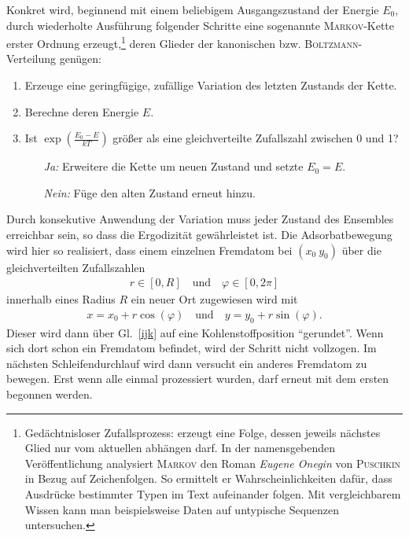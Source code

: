 \documentclass[a4paper, 10pt, twoside, openany]{book} %
\newcommand \parens[1]{\left ( #1 \right )}
\def \phi {\varphi}
\begin{document}
Konkret wird, beginnend mit einem beliebigem Ausgangszustand der Energie $E_0$, durch wiederholte Ausführung folgender Schritte eine sogenannte \textsc{Markov}-Kette erster Ordnung erzeugt,\footnote{Gedächtnisloser Zufallsprozess: erzeugt eine Folge, dessen jeweils nächstes Glied nur vom aktuellen abhängen darf. In der namensgebenden Veröffentlichung \cite{Markov} analysiert \textsc{Markov} den Roman \emph{Eugene Onegin} von \textsc{Puschkin} in Bezug auf Zeichenfolgen. So  ermittelt er Wahrscheinlichkeiten dafür, dass Ausdrücke bestimmter Typen im Text aufeinander folgen. Mit vergleichbarem Wissen kann man beispielsweise Daten auf untypische Sequenzen untersuchen.} deren Glieder der kanonischen bzw. \textsc{Boltzmann}-Verteilung genügen:
%
\begin{enumerate}
    \item Erzeuge eine geringfügige, zufällige Variation des letzten Zustands der Kette.
    \item Berechne deren Energie $E$.
    \item Ist $\exp \parens{\frac{E_0 - E}{k T}}$ größer als eine gleichverteilte Zufallszahl zwischen 0 und 1?
    \begin{itemize}
        \item[\emph{Ja:}] Erweitere die Kette um neuen Zustand und setzte $E_0 = E$.
        \item[\emph{Nein:}] Füge den alten Zustand erneut hinzu.
    \end{itemize}
\end{enumerate}
%
Durch konsekutive Anwendung der Variation muss jeder Zustand des Ensembles erreichbar sein, so dass die Ergodizität gewährleistet ist. Die Adsorbatbewegung wird hier so realisiert, dass einem einzelnen Fremdatom bei $(x_0 \ y_0)$ über die gleichverteilten Zufallszahlen
%
\begin{align*}
    r \in [0, R] \quad \text{und} \quad \phi \in [0, 2 \pi]
\end{align*}
%
innerhalb eines Radius $R$ ein neuer Ort zugewiesen wird mit
%
\begin{align*}
    x = x_0 + r \cos(\phi) \quad \text{und} \quad y = y_0 + r \sin(\phi).
\end{align*}
%
Dieser wird dann über Gl.~\ref{ijk} auf eine Kohlenstoffposition "`gerundet"'. Wenn sich dort schon ein Fremdatom befindet, wird der Schritt nicht vollzogen. Im nächsten Schleifendurchlauf wird dann versucht ein anderes Fremdatom zu bewegen. Erst wenn alle einmal prozessiert wurden, darf erneut mit dem ersten begonnen werden.
\end{document}
